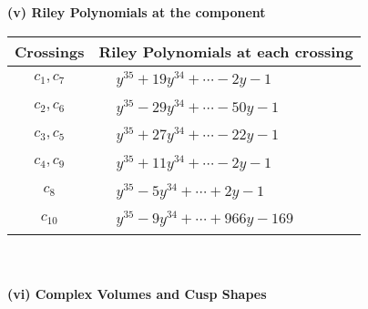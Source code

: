 \documentclass[1p]{elsarticle_modified}
\theoremstyle{definition}
\begin{document}
\newpage\renewcommand{\arraystretch}{1}
\flushleft \textbf{(v) Riley Polynomials at the component}\newline \\
\begin{tabular}{m{50pt}|m{274pt}}
Crossings & \hspace{64pt}Riley Polynomials at each crossing \\
\hline $$\begin{aligned}c_{1},c_{7}\end{aligned}$$&$\begin{aligned}
&y^{35}+19 y^{34}+\cdots-2 y-1
\end{aligned}$\\
\hline $$\begin{aligned}c_{2},c_{6}\end{aligned}$$&$\begin{aligned}
&y^{35}-29 y^{34}+\cdots-50 y-1
\end{aligned}$\\
\hline $$\begin{aligned}c_{3},c_{5}\end{aligned}$$&$\begin{aligned}
&y^{35}+27 y^{34}+\cdots-22 y-1
\end{aligned}$\\
\hline $$\begin{aligned}c_{4},c_{9}\end{aligned}$$&$\begin{aligned}
&y^{35}+11 y^{34}+\cdots-2 y-1
\end{aligned}$\\
\hline $$\begin{aligned}c_{8}\end{aligned}$$&$\begin{aligned}
&y^{35}-5 y^{34}+\cdots+2 y-1
\end{aligned}$\\
\hline $$\begin{aligned}c_{10}\end{aligned}$$&$\begin{aligned}
&y^{35}-9 y^{34}+\cdots+966 y-169
\end{aligned}$\\
\hline
\end{tabular}\\~\\
\newpage\flushleft \textbf{(vi) Complex Volumes and Cusp Shapes}
\end{document}
